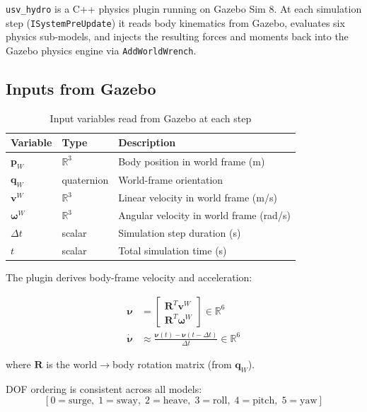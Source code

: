 \documentclass[12pt,a4paper]{article}
\newcommand{\nuvec}{\boldsymbol{\nu}}
\newcommand{\nudot}{\dot{\boldsymbol{\nu}}}
\begin{document}
\texttt{usv\_hydro} is a C++ physics plugin running on Gazebo Sim 8.
At each simulation step (\texttt{ISystemPreUpdate}) it reads body kinematics
from Gazebo, evaluates six physics sub-models, and injects the resulting
forces and moments back into the Gazebo physics engine via
\texttt{AddWorldWrench}.

\subsection{Inputs from Gazebo}

\begin{table}[H]
  \centering
  \caption{Input variables read from Gazebo at each step}
  \begin{tabularx}{\linewidth}{llX}
    \toprule
    \textbf{Variable} & \textbf{Type} & \textbf{Description} \\
    \midrule
    $\mathbf{p}_W$ & $\mathbb{R}^3$ & Body position in world frame (m) \\
    $\mathbf{q}_W$ & quaternion & World-frame orientation \\
    $\mathbf{v}^W$ & $\mathbb{R}^3$ & Linear velocity in world frame (m/s) \\
    $\boldsymbol{\omega}^W$ & $\mathbb{R}^3$ & Angular velocity in world frame (rad/s) \\
    $\Delta t$ & scalar & Simulation step duration (s) \\
    $t$ & scalar & Total simulation time (s) \\
    \bottomrule
  \end{tabularx}
\end{table}

The plugin derives body-frame velocity and acceleration:

\begin{align}
  \nuvec &= \begin{bmatrix}
    \mathbf{R}^T \mathbf{v}^W \\[2pt]
    \mathbf{R}^T \boldsymbol{\omega}^W
  \end{bmatrix} \in \mathbb{R}^6
  \label{eq:body_vel} \\[6pt]
  \nudot &\approx \frac{\nuvec(t) - \nuvec(t-\Delta t)}{\Delta t} \in \mathbb{R}^6
  \label{eq:body_accel}
\end{align}

where $\mathbf{R}$ is the world$\to$body rotation matrix (from $\mathbf{q}_W$).

\medskip
DOF ordering is consistent across all models:
\[
  [0{=}\text{surge},\;
   1{=}\text{sway},\;
   2{=}\text{heave},\;
   3{=}\text{roll},\;
   4{=}\text{pitch},\;
   5{=}\text{yaw}]
\]
\end{document}
